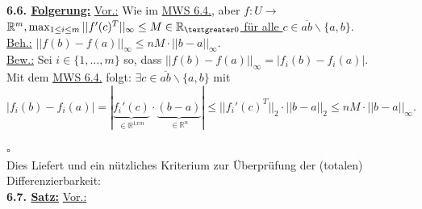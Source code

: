 \documentclass[]{scrartcl}
\begin{document}
 \textbf{6.6. \underline{Folgerung:}} \underline{Vor.:} Wie im 
 \ul{MWS 6.4.}, aber 
 $f:U\rightarrow$\ul{$\mathbb{R}^m, \max_{1\leq i\leq 
 m}||f'(c)^T||_\infty \leq M\in \mathbb{R}_{\textgreater 0}$ für alle $c \in 
 \overline{ab}\backslash\{a,b\}$}.\\
 \underline{Beh.:} \ul{$||f(b)-f(a)||_\infty\leq nM\cdot||b-a||_\infty$}.\\
 \underline{Bew.:} Sei $i\in \{1,...,m\}$ so, dass $||f(b)-f(a)||_\infty = 
 |f_i(b)-f_i(a)|.$\\
 Mit dem \ul{MWS 6.4.} folgt: $\exists c \in 
 \overline{ab}\backslash\{a,b\}$ mit 
 $|f_i(b)-f_i(a)|=|\underbrace{f_i'(c)}_{\in \mathbb{R}^{1xm}}\cdot\underbrace{(b-a)}_{\in\mathbb{R}^n}|
  \leq ||f_i'(c)^T||_2\cdot||b-a||_2\leq nM\cdot ||b-a||_\infty.$\\
 \strut\hfill$\square$\\
 Dies Liefert und ein nützliches Kriterium zur Überprüfung der (totalen) 
 Differenzierbarkeit:\\
 \textbf{6.7. \underline{Satz:}} \underline{Vor.:}
\end{document}
